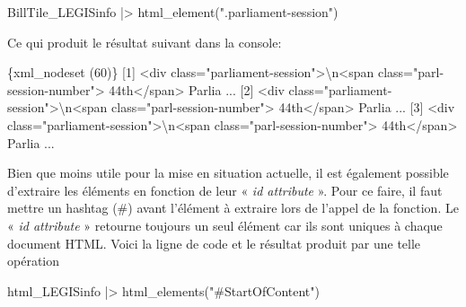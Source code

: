 \documentclass[
  letterpaper,
  DIV=11,
  numbers=noendperiod,
  oneside]{scrreprt}
\newenvironment{Shaded}{\begin{snugshade}}{\end{snugshade}}
\newcommand{\DataTypeTok}[1]{\textcolor[rgb]{0.68,0.00,0.00}{#1}}
\newcommand{\ErrorTok}[1]{\textcolor[rgb]{0.68,0.00,0.00}{#1}}
\newcommand{\ExtensionTok}[1]{\textcolor[rgb]{0.00,0.23,0.31}{#1}}
\newcommand{\KeywordTok}[1]{\textcolor[rgb]{0.00,0.23,0.31}{#1}}
\newcommand{\NormalTok}[1]{\textcolor[rgb]{0.00,0.23,0.31}{#1}}
\newcommand{\OperatorTok}[1]{\textcolor[rgb]{0.37,0.37,0.37}{#1}}
\newcommand{\StringTok}[1]{\textcolor[rgb]{0.13,0.47,0.30}{#1}}
\begin{document}
\begin{Shaded}
\begin{Highlighting}[]
\ExtensionTok{BillTile\_LEGISinfo} \KeywordTok{|}\OperatorTok{\textgreater{}}\NormalTok{ html\_element}\KeywordTok{(}\StringTok{".parliament{-}session"}\KeywordTok{)} 
\end{Highlighting}
\end{Shaded}

Ce qui produit le résultat suivant dans la console:

\begin{Shaded}
\begin{Highlighting}[]
\ExtensionTok{\{xml\_nodeset} \ErrorTok{(}\ExtensionTok{60}\KeywordTok{)}\ErrorTok{\}}
 \ExtensionTok{[1]} \OperatorTok{\textless{}}\NormalTok{div class=}\StringTok{"parliament{-}session"}\OperatorTok{\textgreater{}}\DataTypeTok{\textbackslash{}n}\OperatorTok{\textless{}}\NormalTok{span class=}\StringTok{"parl{-}session{-}number"}\OperatorTok{\textgreater{}}
 \ExtensionTok{44th}\OperatorTok{\textless{}}\NormalTok{/span}\OperatorTok{\textgreater{}}\NormalTok{ Parlia ...}
 \ExtensionTok{[2]} \OperatorTok{\textless{}}\NormalTok{div class=}\StringTok{"parliament{-}session"}\OperatorTok{\textgreater{}}\DataTypeTok{\textbackslash{}n}\OperatorTok{\textless{}}\NormalTok{span class=}\StringTok{"parl{-}session{-}number"}\OperatorTok{\textgreater{}}
 \ExtensionTok{44th}\OperatorTok{\textless{}}\NormalTok{/span}\OperatorTok{\textgreater{}}\NormalTok{ Parlia ...}
 \ExtensionTok{[3]} \OperatorTok{\textless{}}\NormalTok{div class=}\StringTok{"parliament{-}session"}\OperatorTok{\textgreater{}}\DataTypeTok{\textbackslash{}n}\OperatorTok{\textless{}}\NormalTok{span class=}\StringTok{"parl{-}session{-}number"}\OperatorTok{\textgreater{}}
 \ExtensionTok{44th}\OperatorTok{\textless{}}\NormalTok{/span}\OperatorTok{\textgreater{}}\NormalTok{ Parlia ...}
\end{Highlighting}
\end{Shaded}

Bien que moins utile pour la mise en situation actuelle, il est
également possible d'extraire les éléments en fonction de leur «
\emph{id attribute} ». Pour ce faire, il faut mettre un hashtag (\#)
avant l'élément à extraire lors de l'appel de la fonction. Le « \emph{id
attribute} » retourne toujours un seul élément car ils sont uniques à
chaque document HTML. Voici la ligne de code et le résultat produit par
une telle opération

\begin{Shaded}
\begin{Highlighting}[]
\ExtensionTok{html\_LEGISinfo} \KeywordTok{|}\OperatorTok{\textgreater{}}\NormalTok{ html\_elements}\KeywordTok{(}\StringTok{"\#StartOfContent"}\KeywordTok{)}
\end{Highlighting}
\end{Shaded}
\end{document}
